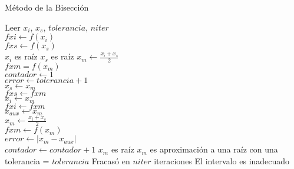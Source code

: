 \documentclass[12pt]{article}
\begin{document}
    \begin{algorithm}[H]
        
        \caption{Método de la Bisección}
        \SetAlgoLined
        Leer $x_i$, $x_s$, $tolerancia$, $niter$ \\
        $fxi \leftarrow f(x_i)$ \\
        $fxs \leftarrow f(x_s)$ \\
        {$x_i$ es raíz}
        {$x_s$ es raíz}
        {
            $x_m \leftarrow \frac{x_i + x_s}{2}$\\
            $fxm = f(x_m)$\\
            $contador \leftarrow 1$\\
            $error \leftarrow tolerancia + 1$ \\
            {
                {$x_s \leftarrow x_m$\\
                $fxs \leftarrow fxm$\\}
                {$x_i \leftarrow x_m$\\
                $fxi \leftarrow fxm$\\}
                $x_{aux} \leftarrow x_m$\\
                $x_m \leftarrow \frac{x_i + x_s}{2}$\\
                $fxm \leftarrow f(x_m)$\\
                $error \leftarrow |x_m - x_{aux}|$\\
                $contador \leftarrow contador + 1$
            }
            {$x_m$ es raíz}
            {$x_m$ es aproximación a una raíz con una tolerancia = $tolerancia$}
            \Else
            {Fracasó en $niter$ iteraciones}
        }
        \Else
        {El intervalo es inadecuado}
    \end{algorithm}
\end{document}

